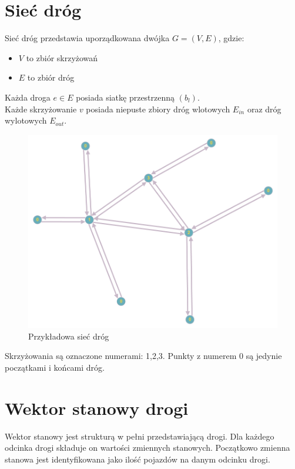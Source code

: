 \documentclass[12pt]{book}
\theoremstyle{plain}
\begin{document}
\section{Sieć dróg}
Sieć dróg przedstawia uporządkowana dwójka $G=(V,E)$, gdzie:
\begin{itemize}
	\item $V$ to zbiór skrzyżowań
	\item $E$ to zbiór dróg
\end{itemize}
Każda droga $e \in E$ posiada siatkę przestrzenną $(b_l)$.\\
Każde skrzyżowanie $v$ posiada niepuste zbiory dróg wlotowych $E_{in}$ oraz dróg wylotowych $E_{out}$.\\
\begin{minipage}{12cm}
	\begin{figure}[H]
		\includegraphics[width=12cm]{network}
		\caption{\label{fig:network} Przykładowa sieć dróg}
	\end{figure}
\end{minipage} \hfill
\begin{minipage}{5cm}
	Skrzyżowania są oznaczone numerami: 1,2,3.
	Punkty z numerem 0 są jedynie początkami i końcami dróg.
\end{minipage}
 \noindent
\section{Wektor stanowy drogi} \label{sec:wektor_stanowy_drogi}
Wektor stanowy jest strukturą w pełni przedstawiającą drogi. Dla każdego odcinka drogi składuje on wartości zmiennych stanowych. Początkowo zmienna stanowa jest identyfikowana jako ilość pojazdów na danym odcinku drogi. 
\end{document}
